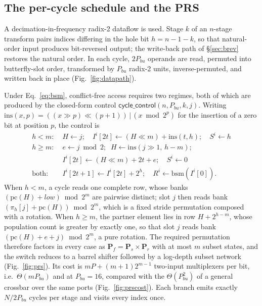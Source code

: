 \documentclass[twocolumn,10pt]{article}
\newcommand{\bsm}{\mathrm{bsm}}
\newcommand{\ins}{\mathrm{ins}}
\newcommand{\Pbu}{P_{bu}}
\begin{document}
\subsection{The per-cycle schedule and the PRS}\label{sec:sched}

A decimation-in-frequency radix-2 dataflow is used.  Stage $k$ of an $n$-stage
transform pairs indices differing in the hole bit $h = n{-}1{-}k$, so that
natural-order input produces bit-reversed output; the write-back path of
\S\ref{sec:brev} restores the natural order.  In each cycle, $2\Pbu$ operands
are read, permuted into butterfly-slot order, transformed by $\Pbu$ radix-2
units, inverse-permuted, and written back in place (Fig.~\ref{fig:datapath}).

Under Eq.~\ref{eq:bsm}, conflict-free access requires two regimes, both of
which are produced by the closed-form control
$\mathsf{cycle\_control}(n,\Pbu,k,j)$.  Writing
$\ins(x,p) = ((x \gg p) \ll (p{+}1)) \,|\, (x \bmod 2^p)$ for the insertion of
a zero bit at position $p$, the control is
\begin{align*}
h < m:\;& H \leftarrow j; \quad
  I^i[2t] \leftarrow (H \ll m) + \ins(t,h); \quad S^i \leftarrow h\\
h \ge m:\;& e \leftarrow j \bmod 2;\;\; H \leftarrow \ins(j \gg 1,\, h{-}m);\\
 & I^i[2t] \leftarrow (H \ll m) + 2t + e; \quad S^i \leftarrow 0\\
\text{both}:\;& I^i[2t{+}1] \leftarrow I^i[2t] + 2^h;\quad
  R^i \leftarrow \bsm(I^i[0]).
\end{align*}
When $h<m$, a cycle reads one complete row, whose banks
$(\mathrm{pc}(H)+\mathit{low}) \bmod 2^m$ are pairwise distinct; slot $j$ then
reads bank $(\pi_h[j]+\mathrm{pc}(H)) \bmod 2^m$, which is a fixed stride
permutation composed with a rotation.  When $h\ge m$, the partner element lies
in row $H+2^{h-m}$, whose population count is greater by exactly one, so that
slot $j$ reads bank $(\mathrm{pc}(H)+e+j)\bmod 2^m$, a pure rotation.  The
required permutation therefore factors in every case as
$\mathbf{P}_f = \mathbf{P}_s \times \mathbf{P}_r$ with at most $m$ subset states,
and the switch reduces to a barrel shifter followed by a log-depth subset
network (Fig.~\ref{fig:prs}).  Its cost is $mP + (m{+}1)2^{m-1}$ two-input
multiplexers per bit, i.e.\ $\Theta(m\Pbu)$ and \PrsMux{} at $\Pbu{=}16$,
compared with the $\Theta(\Pbu^2)$ of a general crossbar over the same ports
(Fig.~\ref{fig:prscost}).  Each branch emits exactly $N/2\Pbu$ cycles per stage
and visits every index once.
\end{document}
